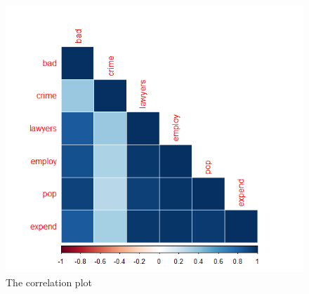 \documentclass{article}
\begin{document}
    \begin{figure}
        \centering
        \includegraphics[scale=0.4]{../results/4_lower_corrplot.png}
        \caption{The correlation plot}
        \label{fig:cormatrix}
    \end{figure} 
\end{document}
